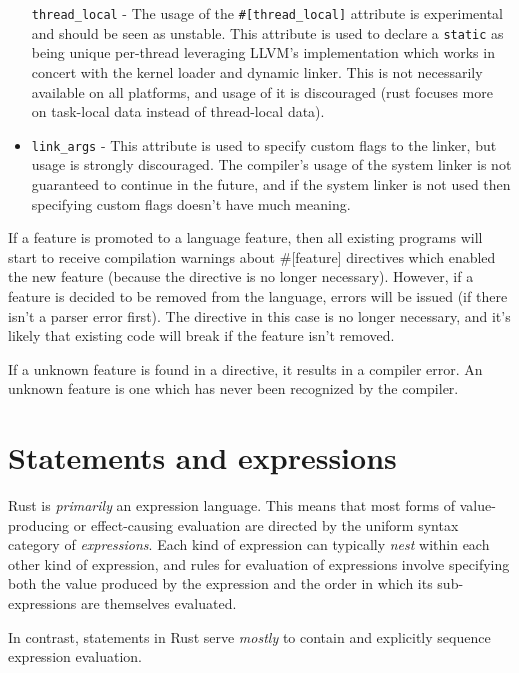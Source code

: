 \documentclass[]{article}
\begin{document}
\begin{itemize}
  \texttt{thread\_local} - The usage of the
  \texttt{\#{[}thread\_local{]}} attribute is experimental and should be
  seen as unstable. This attribute is used to declare a \texttt{static}
  as being unique per-thread leveraging LLVM's implementation which
  works in concert with the kernel loader and dynamic linker. This is
  not necessarily available on all platforms, and usage of it is
  discouraged (rust focuses more on task-local data instead of
  thread-local data).
\item
  \texttt{link\_args} - This attribute is used to specify custom flags
  to the linker, but usage is strongly discouraged. The compiler's usage
  of the system linker is not guaranteed to continue in the future, and
  if the system linker is not used then specifying custom flags doesn't
  have much meaning.
\end{itemize}

If a feature is promoted to a language feature, then all existing
programs will start to receive compilation warnings about
\#{[}feature{]} directives which enabled the new feature (because the
directive is no longer necessary). However, if a feature is decided to
be removed from the language, errors will be issued (if there isn't a
parser error first). The directive in this case is no longer necessary,
and it's likely that existing code will break if the feature isn't
removed.

If a unknown feature is found in a directive, it results in a compiler
error. An unknown feature is one which has never been recognized by the
compiler.

\section{Statements and expressions}\label{statements-and-expressions}

Rust is \emph{primarily} an expression language. This means that most
forms of value-producing or effect-causing evaluation are directed by
the uniform syntax category of \emph{expressions}. Each kind of
expression can typically \emph{nest} within each other kind of
expression, and rules for evaluation of expressions involve specifying
both the value produced by the expression and the order in which its
sub-expressions are themselves evaluated.

In contrast, statements in Rust serve \emph{mostly} to contain and
explicitly sequence expression evaluation.

\end{document}
